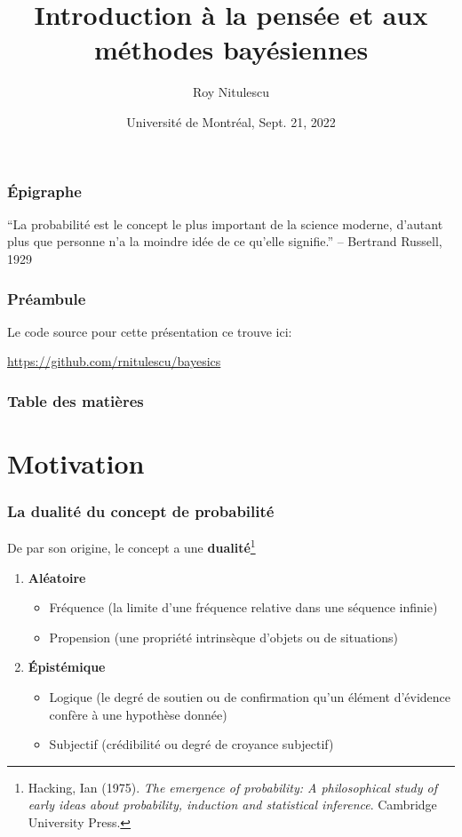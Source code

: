 \documentclass{beamer}
\title{Introduction à la pensée et aux méthodes bayésiennes}
\author{Roy Nitulescu\inst{1}}
\institute
{
    \inst{1}%
    CITADEL\\
    CR-CHUM
}
\date[UdeM, Sept. 21, 2022]{Université de Montréal, Sept. 21, 2022}
\begin{document}

\frame{\titlepage}

\begin{frame}
    \frametitle{Épigraphe}
    ``La probabilité est le concept le plus important de la science moderne,
    d'autant plus que personne n'a la moindre idée de ce qu'elle signifie.'' -- Bertrand Russell, 1929
\end{frame}


\begin{frame}
    \frametitle{Préambule}
    
    Le code source pour cette présentation ce trouve ici:

    \vfill

    \url{https://github.com/rnitulescu/bayesics}
\end{frame}


\begin{frame}
    \frametitle{Table des matières}
    \tableofcontents
\end{frame}



\section{Motivation}

\begin{frame}
    \frametitle{La dualité du concept de probabilité}

    De par son origine, le concept a une \textbf{dualité}\footnote{
    Hacking, Ian (1975). \emph{The emergence of probability:
    A philosophical study of early ideas about probability,
    induction and statistical inference}. Cambridge University Press.
    }

    \pause

    \vfill

    \begin{enumerate}
      \item \textbf{Aléatoire}
        \begin{itemize}
          \item Fréquence (la limite d'une fréquence relative dans une séquence infinie)
          \item Propension (une propriété intrinsèque d'objets ou de situations)
        \end{itemize}

      \pause

      \item \textbf{Épistémique}
        \begin{itemize}
          \item Logique (le degré de soutien ou de confirmation qu'un élément d'évidence confère à une hypothèse donnée)
          \item Subjectif (crédibilité ou degré de croyance subjectif)
        \end{itemize}
    \end{enumerate}    
\end{frame}
\end{document}
